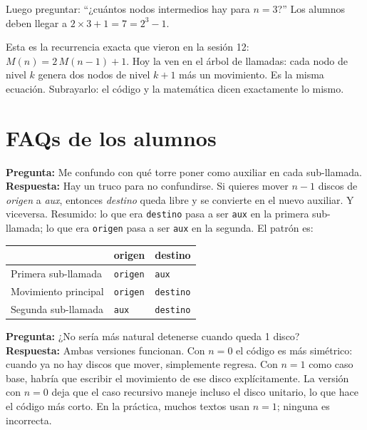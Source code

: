 \documentclass[12pt, oneside]{article}
\begin{document}
Luego preguntar: ``¿cuántos nodos intermedios hay para $n=3$?''
Los alumnos deben llegar a $2 \times 3 + 1 = 7 = 2^3 - 1$.

\begin{notaprofesor}
  Esta es la recurrencia exacta que vieron en la sesión 12:
  $M(n) = 2\,M(n-1) + 1$.  Hoy la ven en el árbol de llamadas: cada
  nodo de nivel $k$ genera dos nodos de nivel $k+1$ más un movimiento.
  Es la misma ecuación.  Subrayarlo: el código y la matemática dicen
  exactamente lo mismo.
\end{notaprofesor}

\section{FAQs de los alumnos}

\begin{notaprofesor}
  \textbf{Pregunta:} Me confundo con qué torre poner como auxiliar en cada
  sub-llamada.\\
  \textbf{Respuesta:} Hay un truco para no confundirse.  Si quieres mover
  $n-1$ discos de \textit{origen} a \textit{aux}, entonces \textit{destino}
  queda libre y se convierte en el nuevo auxiliar.  Y viceversa.
  Resumido: lo que era \texttt{destino} pasa a ser \texttt{aux} en la primera
  sub-llamada; lo que era \texttt{origen} pasa a ser \texttt{aux} en la
  segunda.  El patrón es:
  \begin{center}
  \begin{tabular}{lll}
    \toprule
    & \textbf{origen} & \textbf{destino} \\
    \midrule
    Primera sub-llamada  & \texttt{origen} & \texttt{aux} \\
    Movimiento principal & \texttt{origen} & \texttt{destino} \\
    Segunda sub-llamada  & \texttt{aux}    & \texttt{destino} \\
    \bottomrule
  \end{tabular}
  \end{center}
\end{notaprofesor}

\begin{notaprofesor}[FAQ 2 — ¿Por qué el caso base es $n=0$ y no $n=1$?]
  \textbf{Pregunta:} ¿No sería más natural detenerse cuando queda 1 disco?\\
  \textbf{Respuesta:} Ambas versiones funcionan.  Con $n=0$ el código es
  más simétrico: cuando ya no hay discos que mover, simplemente regresa.
  Con $n=1$ como caso base, habría que escribir el movimiento de ese disco
  explícitamente.  La versión con $n=0$ deja que el caso recursivo maneje
  incluso el disco unitario, lo que hace el código más corto.
  En la práctica, muchos textos usan $n=1$; ninguna es incorrecta.
\end{notaprofesor}
\end{document}
